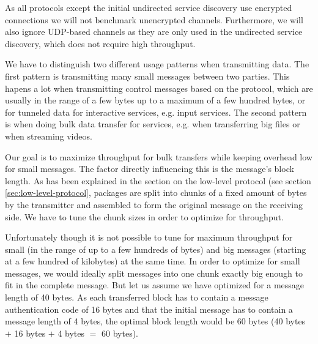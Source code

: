 As all protocols except the initial undirected service discovery use encrypted connections we will not benchmark unencrypted channels.
Furthermore, we will also ignore UDP-based channels as they are only used in the undirected service discovery, which does not require high throughput.

\medskip

We have to distinguish two different usage patterns when transmitting data.
The first pattern is transmitting many small messages between two parties.
This hapens a lot when transmitting control messages based on the protocol, which are usually in the range of a few bytes up to a maximum of a few hundred bytes, or for tunneled data for interactive services, e.g. input services.
The second pattern is when doing bulk data transfer for services, e.g. when transferring big files or when streaming videos.

Our goal is to maximize throughput for bulk transfers while keeping overhead low for small messages.
The factor directly influencing this is the message's block length.
As has been explained in the section on the low-level protocol (see section \ref{sec:low-level-protocol}, packages are split into chunks of a fixed amount of bytes by the transmitter and assembled to form the original message on the receiving side.
We have to tune the chunk sizes in order to optimize for throughput.

Unfortunately though it is not possible to tune for maximum throughput for small (in the range of up to a few hundreds of bytes) and big messages (starting at a few hundred of kilobytes) at the same time.
In order to optimize for small messages, we would ideally split messages into one chunk exactly big enough to fit in the complete message.
But let us assume we have optimized for a message length of 40 bytes.
As each transferred block has to contain a message authentication code of 16 bytes and that the initial message has to contain a message length of 4 bytes, the optimal block length would be 60 bytes (40 bytes $+$ 16 bytes $+$ 4 bytes $=$ 60 bytes).

